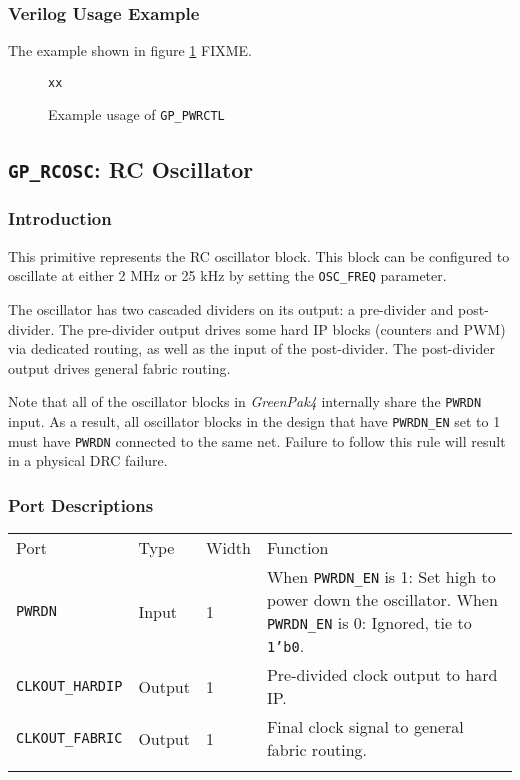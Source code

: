 \documentclass[11pt]{article}
\newcommand{\namestyle}[1]{\textit{#1}}
\newcommand{\tokenstyle}[1]{\texttt{#1}}
\newcommand{\datastyle}[1]{\texttt{#1}}
\newcommand{\whenstyle}[1]{{\fontseries{sb}\selectfont#1}}
\newcommand{\thinhline}{\Xhline{1\arrayrulewidth}}
\newcommand{\thickhline}{\Xhline{2.5\arrayrulewidth}}
\begin{document}
\subsubsection{Verilog Usage Example}

The example shown in figure \ref{gp-pwrctl-example} FIXME.

\begin{figure}[h]
\begin{lstlisting}
xx
\end{lstlisting}
\caption{Example usage of \tokenstyle{GP\_PWRCTL}}
\label{gp-pwrctl-example}
\end{figure}


\pagebreak
\subsection{\tokenstyle{GP\_RCOSC}: RC Oscillator}
\label{gp-rcosc}

\subsubsection{Introduction}
This primitive represents the RC oscillator block. This block can be configured to oscillate at either 2 MHz or 25 kHz
by setting the \tokenstyle{OSC\_FREQ} parameter.

The oscillator has two cascaded dividers on its output: a pre-divider and post-divider. The pre-divider output drives
some hard IP blocks (counters and PWM) via dedicated routing, as well as the input of the post-divider. The
post-divider output drives general fabric routing.

Note that all of the oscillator blocks in \namestyle{GreenPak4} internally share the \tokenstyle{PWRDN} input. As a result, all oscillator blocks in the design that have \tokenstyle{PWRDN\_EN} set to 1 must have \tokenstyle{PWRDN} connected to the same net. Failure to follow this rule will result in a physical DRC failure.

\subsubsection{Port Descriptions}

\begin{tabularx}{\textwidth}{lllX}
\thinhline
\whenstyle{Port} & \whenstyle{Type} & \whenstyle{Width} & \whenstyle{Function} \\
\thickhline
\tokenstyle{PWRDN} & Input & 1 &
	\whenstyle{When \tokenstyle{PWRDN\_EN} is 1:} Set high to power down the oscillator. \newline
	\whenstyle{When \tokenstyle{PWRDN\_EN} is 0:} Ignored, tie to \datastyle{1'b0}.\\
\thinhline
\tokenstyle{CLKOUT\_HARDIP} & Output & 1 & Pre-divided clock output to hard IP. \\
\thinhline
\tokenstyle{CLKOUT\_FABRIC} & Output & 1 & Final clock signal to general fabric routing. \\
\thinhline
\end{tabularx}
\end{document}
